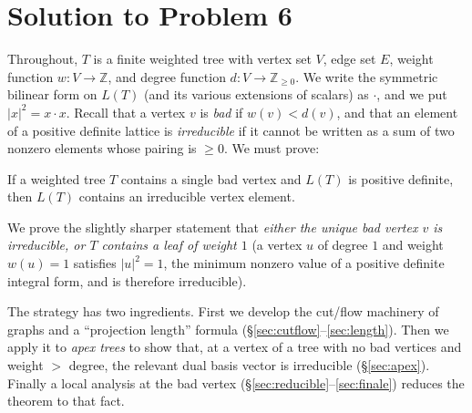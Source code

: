 \providecommand{\bZ}{\mathbb{Z}}
\providecommand{\bQ}{\mathbb{Q}}
\providecommand{\bR}{\mathbb{R}}
\providecommand{\bN}{\mathbb{N}}
\providecommand{\norm}[1]{\lvert #1\rvert^{2}}
\providecommand{\Cut}{\operatorname{Cut}}
\providecommand{\Flow}{\operatorname{Flow}}
\providecommand{\im}{\operatorname{im}}
\providecommand{\cok}{\operatorname{cok}}
\providecommand{\cF}{\mathcal{F}}
\providecommand{\cC}{\mathcal{C}}
\makeatletter
{}
\makeatother

\section*{Solution to Problem 6}

Throughout, $T$ is a finite weighted tree with vertex set $V$, edge set $E$, weight
function $w:V\to\bZ$, and degree function $d:V\to\bZ_{\ge 0}$.  We write the symmetric
bilinear form on $L(T)$ (and its various extensions of scalars) as $\cdot$, and we put
$\norm{x}=x\cdot x$.  Recall that a vertex $v$ is \emph{bad} if $w(v)<d(v)$, and that an
element of a positive definite lattice is \emph{irreducible} if it cannot be written as a
sum of two nonzero elements whose pairing is $\ge 0$.  We must prove:

\begin{thm}
\label{thm:one_bad_vtx}
If a weighted tree $T$ contains a single bad vertex and $L(T)$ is positive definite, then
$L(T)$ contains an irreducible vertex element.
\end{thm}

We prove the slightly sharper statement that \emph{either the unique bad vertex $v$ is
irreducible, or $T$ contains a leaf of weight $1$} (a vertex $u$ of degree $1$ and weight
$w(u)=1$ satisfies $\norm{u}=1$, the minimum nonzero value of a positive definite integral
form, and is therefore irreducible).

The strategy has two ingredients.  First we develop the cut/flow machinery of graphs and a
``projection length'' formula (\S\ref{sec:cutflow}--\ref{sec:length}).  Then we apply it to
\emph{apex trees} to show that, at a vertex of a tree with no bad vertices and weight $>$
degree, the relevant dual basis vector is irreducible
(\S\ref{sec:apex}).  Finally a local analysis at the bad vertex
(\S\ref{sec:reducible}--\ref{sec:finale}) reduces the theorem to that fact.

